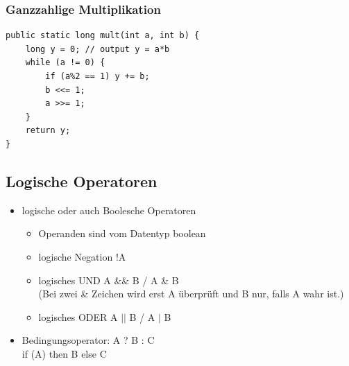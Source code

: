 \documentclass[a4paper,10pt]{article}
\begin{document}
\subsubsection{Ganzzahlige Multiplikation}
\begin{lstlisting}
public static long mult(int a, int b) {
	long y = 0; // output y = a*b
	while (a != 0) {
		if (a%2 == 1) y += b; 
		b <<= 1;
		a >>= 1;
	}
	return y;
}
\end{lstlisting}

\subsection{Logische Operatoren}

\begin{itemize}
	\item logische oder auch Boolesche Operatoren
		\begin{itemize}
			\item Operanden sind vom Datentyp boolean
			\item logische Negation !A
			\item logisches UND A \&\& B  / A \& B \\
				(Bei zwei \& Zeichen wird erst A \"uberpr\"uft und B nur, falls A wahr ist.)
			\item logisches ODER A $||$ B / A $|$ B
		\end{itemize}
	\item Bedingungsoperator: A ? B : C \\
		if (A) then B else C
\end{itemize}
\end{document}
